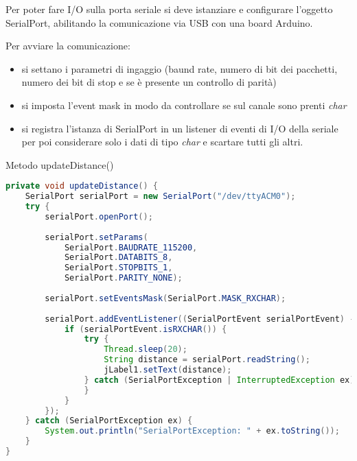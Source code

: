 Per poter fare I/O sulla porta seriale si deve istanziare e configurare l'oggetto SerialPort, abilitando la comunicazione via USB con una board Arduino.

Per avviare la comunicazione:
\begin{itemize}
	\item si settano i parametri di ingaggio (baund rate, numero di bit dei pacchetti, numero dei bit di stop e se è presente un controllo di parità)
	
	\item si imposta l'event mask in modo da controllare se sul canale sono prenti \textit{char}
	
	\item si registra l'istanza di SerialPort in un listener di eventi di I/O della seriale per poi considerare solo i dati di tipo \textit{char} e scartare tutti gli altri. 
\end{itemize}


Metodo updateDistance()
\begin{lstlisting}[language=Java]
private void updateDistance() {    
	SerialPort serialPort = new SerialPort("/dev/ttyACM0");
	try {
		serialPort.openPort();
		
		serialPort.setParams( 
			SerialPort.BAUDRATE_115200, 
			SerialPort.DATABITS_8, 
			SerialPort.STOPBITS_1,
			SerialPort.PARITY_NONE);
			
		serialPort.setEventsMask(SerialPort.MASK_RXCHAR);
		
		serialPort.addEventListener((SerialPortEvent serialPortEvent) -> {
			if (serialPortEvent.isRXCHAR()) {
				try {
					Thread.sleep(20);
					String distance = serialPort.readString();
					jLabel1.setText(distance);
				} catch (SerialPortException | InterruptedException ex) {
				}
			}
		});
	} catch (SerialPortException ex) {
		System.out.println("SerialPortException: " + ex.toString());
	}
}
\end{lstlisting}

